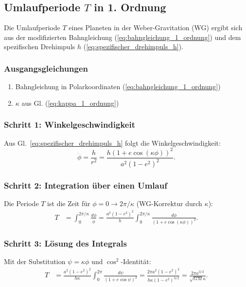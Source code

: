 \newpage
\subsection{Umlaufperiode $T$ in 1. Ordnung}
Die Umlaufperiode $T$ eines Planeten in der Weber-Gravitation (WG) ergibt sich aus der modifizierten Bahngleichung (\ref{eq:bahngleichung_1_ordnung}) und dem spezifischen Drehimpuls $h$ (\ref{eq:spezifischer_drehimpuls_h}).

\subsubsection*{Ausgangsgleichungen}
\begin{enumerate}
    \item Bahngleichung in Polarkoordinaten (\ref{eq:bahngleichung_1_ordnung})
    \item $\kappa$ aus Gl. (\ref{eq:kappa_1_ordnung})
\end{enumerate}

\subsubsection*{Schritt 1: Winkelgeschwindigkeit}
Aus Gl.~\eqref{eq:spezifischer_drehimpuls_h} folgt die Winkelgeschwindigkeit:
\begin{equation}
    \dot{\phi} = \frac{h}{r^2} = \frac{h(1 + e \cos(\kappa \phi))^2}{a^2(1-e^2)^2}.
\end{equation}

\subsubsection*{Schritt 2: Integration über einen Umlauf}
Die Periode $T$ ist die Zeit für $\phi = 0 \to 2\pi/\kappa$ (WG-Korrektur durch $\kappa$):
\begin{align}
    T &= \int_0^{2\pi/\kappa} \frac{d\phi}{\dot{\phi}} 
       = \frac{a^2(1-e^2)^2}{h} \int_0^{2\pi/\kappa} \frac{d\phi}{(1 + e \cos(\kappa \phi))^2}.
\end{align}

\subsubsection*{Schritt 3: Lösung des Integrals}
Mit der Substitution $\psi = \kappa \phi$ und $\cos^2$-Identität:
\begin{align}
\label{eq:integral_t}
    T &= \frac{a^2(1-e^2)^2}{h \kappa} \int_0^{2\pi} \frac{d\psi}{(1 + e \cos \psi)^2} 
       = \frac{2\pi a^2(1-e^2)^2}{h \kappa (1-e^2)^{3/2}} 
       = \frac{2\pi a^{3/2}}{\sqrt{GM} \kappa}.
\end{align}

